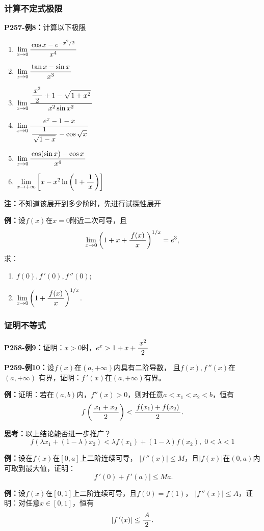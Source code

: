 \subsubsection{计算不定式极限}

{\bf P257-例8：}计算以下极限
\begin{enumerate}[(1)]
  \setlength{\itemindent}{1cm}
  \item $\lim\limits_{x\to{0}}\displaystyle\frac{\,{\cos x-e^{-x^2/2}}\,}{\,{x^4}\,}$ 
  \item $\lim\limits_{x\to{0}}\displaystyle\frac{\,{\tan x-\sin x}\,}{\,{x^3}\,}$
  \item $\lim\limits_{x\to{0}}\displaystyle\frac{\,{\displaystyle\frac{\,{x^2}\,}{\,{2}\,}+1-\sqrt{1+x^2}}\,}{\,{x^2\sin x^2}\,}$ 
  \item $\lim\limits_{x\to{0}}\displaystyle\frac{\,{e^x-1-x}\,}{\,{\displaystyle\frac{\,{1}\,}{\,{\sqrt{1-x}}\,}-\cos\sqrt x}\,}$ 
  \item $\lim\limits_{x\to{0}}\displaystyle\frac{\,{\cos(\sin x)-\cos x}\,}{\,{x^4}\,}$
  \item $\lim\limits_{x\to{+\infty}}\left[x-x^2\ln\left(1+\displaystyle\frac{\,{1}\,}{\,{x}\,}\right)\right]$
\end{enumerate}

{\bf 注：}不知道该展开到多少阶时，先进行试探性展开

{\bf 例：}设$f(x)$在$x=0$附近二次可导，且
$$\lim\limits_{x\to{0}}\left(1+x+\displaystyle\frac{\,{f(x)}\,}{\,{x}\,}\right)^{1/x}=e^3,$$
求：
\begin{enumerate}[(1)]
  \setlength{\itemindent}{1cm}
  \item $f(0),f\,'(0),f\,''(0)$;
  \item $\lim\limits_{x\to{0}}\left(1+\displaystyle\frac{\,{f(x)}\,}{\,{x}\,}\right)^{1/x}$.
\end{enumerate}

\subsubsection{证明不等式}

{\bf P258-例9：}证明：$x>0$时，$e^x>1+x+\displaystyle\frac{\,{x^2}\,}{\,{2}\,}$

{\bf P259-例10：}设$f(x)$在$(a,+\infty)$内具有二阶导数，
且$f(x),f\,''(x)$在$(a,+\infty)$
有界，证明：$f\,'(x)$在$(a,+\infty)$有界。

{\bf 例：}证明：若在$(a,b)$内，$f''(x)>0$，则对任意$a<x_1<x_2<b$，恒有
$$f\left(\displaystyle\frac{\,{x_1+x_2}\,}{\,{2}\,}\right)<\displaystyle\frac{\,{f(x_1)+f(x_2)}\,}{\,{2}\,}.$$

{\bf 思考：}以上结论能否进一步推广？
$${f(\lambda x_1+(1-\lambda)x_2)<\lambda
f(x_1)+(1-\lambda)f(x_2),\;0<\lambda<1}$$

{\bf 例：}设在$f(x)$在$[0,a]$上二阶连续可导，
$|f\,''(x)|\leq M$，且$|f(x)|$在$(0,a)$内可取到最大值，证明：
$$|f\,'(0)+f\,'(a)|\leq Ma.$$

{\bf 例：}设$f(x)$在$[0,1]$上二阶连续可导，且$f(0)=f(1)$，
$|f\,''(x)|\leq A$，证明：对任意$x\in[0,1]$，恒有
$$|f\,'(x)|\leq\displaystyle\frac{\,{A}\,}{\,{2}\,}.$$


